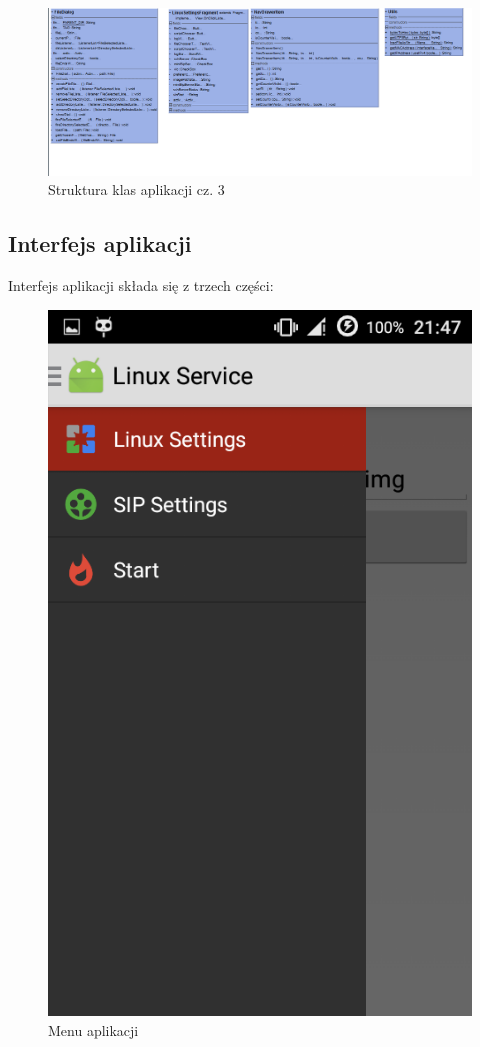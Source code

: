 \begin{figure}[H]
\centering
\includegraphics[width=1.1\linewidth]{uml3}
\caption{Struktura klas aplikacji cz. 3}
\label{fig:uml3}
\end{figure}

\newpage

\subsection{Interfejs aplikacji}
Interfejs aplikacji składa się z trzech części:

\begin{figure}[H]
\centering
\includegraphics[width=0.5\linewidth]{Screenshot_2015-09-20-21-47-49}
\caption{Menu aplikacji}
\label{fig:Screenshot_2015-09-20-21-47-49}
\end{figure}


